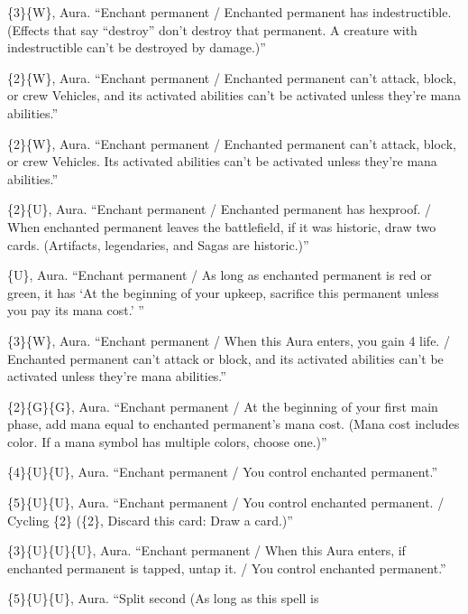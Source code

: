 \documentclass[11pt]{article}
\theoremstyle{definition}
\newcommand{\ms}[1]{\{#1\}}
\newcommand{\card}[1]{{\mdseries\scshape #1}}
\begin{document}
\begin{description}[leftmargin=1em,itemsep=1pt,parsep=0pt]
\item[\card{Indestructibility}] \ms{3}\ms{W}, Aura. ``Enchant permanent / Enchanted permanent
  has indestructible. (Effects that say ``destroy'' don't destroy that permanent. A
  creature with indestructible can't be destroyed by damage.)''
\item[\card{Bound in Gold}] \ms{2}\ms{W}, Aura. ``Enchant permanent / Enchanted permanent can't
  attack, block, or crew Vehicles, and its activated abilities can't be activated unless
  they're mana abilities.''
\item[\card{Intercessor's Arrest}] \ms{2}\ms{W}, Aura. ``Enchant permanent / Enchanted permanent
  can't attack, block, or crew Vehicles. Its activated abilities can't be activated unless
  they're mana abilities.''
\item[\card{Curator's Ward}] \ms{2}\ms{U}, Aura. ``Enchant permanent / Enchanted permanent has
  hexproof. / When enchanted permanent leaves the battlefield, if it was historic, draw two
  cards. (Artifacts, legendaries, and Sagas are historic.)''
\item[\card{Essence Leak}] \ms{U}, Aura. ``Enchant permanent / As long as enchanted permanent is
  red or green, it has `At the beginning of your upkeep, sacrifice this permanent unless you
  pay its mana cost.' ''
\item[\card{Faith's Fetters}] \ms{3}\ms{W}, Aura. ``Enchant permanent / When this Aura enters,
  you gain 4 life. / Enchanted permanent can't attack or block, and its activated abilities
  can't be activated unless they're mana abilities.''
\item[\card{Elemental Resonance}] \ms{2}\ms{G}\ms{G}, Aura. ``Enchant permanent / At the
  beginning of your first main phase, add mana equal to enchanted permanent's mana cost.
  (Mana cost includes color. If a mana symbol has multiple colors, choose one.)''
\item[\card{Confiscate}] \ms{4}\ms{U}\ms{U}, Aura. ``Enchant permanent / You control enchanted
  permanent.''
\item[\card{Lay Claim}] \ms{5}\ms{U}\ms{U}, Aura. ``Enchant permanent / You control enchanted
  permanent. / Cycling \ms{2} (\ms{2}, Discard this card: Draw a card.)''
\item[\card{Volition Reins}] \ms{3}\ms{U}\ms{U}\ms{U}, Aura. ``Enchant permanent / When this Aura
  enters, if enchanted permanent is tapped, untap it. / You control enchanted permanent.''
\item[\card{Take Possession}] \ms{5}\ms{U}\ms{U}, Aura. ``Split second (As long as this spell is

\end{description}
\end{document}
